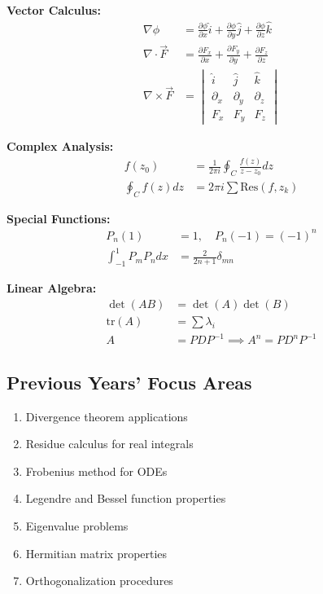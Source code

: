 \documentclass[12pt,a4paper]{article}
\theoremstyle{definition}
\begin{document}
\begin{importantbox}
\textbf{Vector Calculus:}
\begin{align*}
\nabla\phi &= \frac{\partial\phi}{\partial x}\hat{i} + \frac{\partial\phi}{\partial y}\hat{j} + \frac{\partial\phi}{\partial z}\hat{k} \\
\nabla \cdot \vec{F} &= \frac{\partial F_x}{\partial x} + \frac{\partial F_y}{\partial y} + \frac{\partial F_z}{\partial z} \\
\nabla \times \vec{F} &= \begin{vmatrix}\hat{i} & \hat{j} & \hat{k} \\ \partial_x & \partial_y & \partial_z \\ F_x & F_y & F_z\end{vmatrix}
\end{align*}

\textbf{Complex Analysis:}
\begin{align*}
f(z_0) &= \frac{1}{2\pi i}\oint_C \frac{f(z)}{z - z_0}dz \\
\oint_C f(z)dz &= 2\pi i \sum \text{Res}(f, z_k)
\end{align*}

\textbf{Special Functions:}
\begin{align*}
P_n(1) &= 1, \quad P_n(-1) = (-1)^n \\
\int_{-1}^{1} P_m P_n dx &= \frac{2}{2n+1}\delta_{mn}
\end{align*}

\textbf{Linear Algebra:}
\begin{align*}
\det(AB) &= \det(A)\det(B) \\
\text{tr}(A) &= \sum \lambda_i \\
A &= PDP^{-1} \implies A^n = PD^nP^{-1}
\end{align*}
\end{importantbox}

\subsection{Previous Years' Focus Areas}

\begin{enumerate}
    \item Divergence theorem applications
    \item Residue calculus for real integrals
    \item Frobenius method for ODEs
    \item Legendre and Bessel function properties
    \item Eigenvalue problems
    \item Hermitian matrix properties
    \item Orthogonalization procedures
\end{enumerate}
\end{document}
